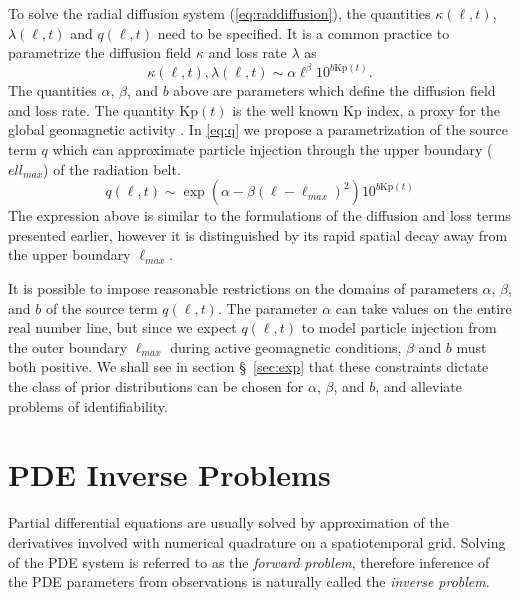To solve the radial diffusion system (\cref{eq:raddiffusion}), the quantities $\kappa(\ell, t)$, 
$\lambda(\ell, t)$ and $q(\ell, t)$ need to be specified. It is a common practice 
\citetext{see \citealp{GRL:GRL10762}, \citealp{JGRA:JGRA15067}, \citealp{JGRA:JGRA18021} and
\citealp{GRL:GRL22815}} to parametrize the diffusion field $\kappa$ and loss rate $\lambda$ as 
%
\begin{equation}\label{eq:paramExp}
  \kappa(\ell, t), \lambda(\ell, t) \sim \alpha \ell^{\beta} 10^{b \mathrm{Kp}(t)}.
\end{equation}
%
The quantities $\alpha$, $\beta$, and $b$ above are parameters which define the diffusion field and 
loss rate. The quantity $\mathrm{Kp}(t)$ is the well known Kp index, a proxy for the global 
geomagnetic activity \citep{BartelsKp}.
%
In \cref{eq:q} we propose a parametrization of the source term $q$ which can approximate particle 
injection through the upper boundary ($ell_{max}$) of the radiation belt. 
%
\begin{equation}\label{eq:q}
q(\ell,t)  \sim \exp(\alpha - \beta (\ell - \ell_{max})^2) 10^{b \mathrm{Kp}(t)}
\end{equation}
%
The expression above is similar to the formulations of the diffusion and loss terms presented 
earlier, however it is distinguished by its rapid spatial decay away from the upper boundary 
$\ell_{max}$.  

It is possible to impose reasonable restrictions on the domains of parameters $\alpha$, $\beta$, 
and $b$ of the source term $q(\ell, t)$. The parameter $\alpha$ can take values on the entire 
real number line, but since we expect $q(\ell, t)$ to model particle injection from the outer 
boundary $\ell_{max}$ during active geomagnetic conditions, $\beta$ and $b$ must both positive. We 
shall see in section \S~\ref{sec:exp} that these constraints dictate the class of prior 
distributions can be chosen for $\alpha$, $\beta$, and $b$, and alleviate problems of 
identifiability.

\section{PDE Inverse Problems}\label{sec:inv}

Partial differential equations are usually solved by approximation of the derivatives involved 
with numerical quadrature on a spatiotemporal grid. Solving of the PDE system is referred to as the 
\emph{forward problem}, therefore inference of the PDE parameters from observations is naturally 
called the \emph{inverse problem}.

